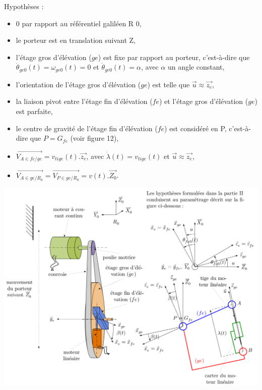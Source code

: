 Hypothèses :
\begin{itemize}
 \item 0 par rapport au référentiel galiléen R 0,
 \item le porteur est en translation suivant Z,
 \item l'étage gros d'élévation ($ge$) est fixe par rapport au porteur, c'est-à-dire que $\dot{\theta}_{ge0}(t)=\omega_{ge0}(t)=0$ et $\dot{\theta}_{ge0}(t)=\alpha$, avec $\alpha$ un angle constant,
 \item l'orientation de l'étage gros d'élévation ($ge$) est telle que $\overrightarrow{u}\approx \overrightarrow{z_e}$,
 \item la liaison pivot entre l'étage fin d'élévation ($fe$) et l'étage gros d'élévation ($ge$) est parfaite,
 \item  le centre de gravité de l'étage fin d'élévation ($fe$) est considéré en P, c'est-à-dire que $P=G_{fe}$ (voir figure 12),
 \item $\overrightarrow{V_{A\in fe/ge}}= v_{tige}(t).\overrightarrow{z_e}$, avec $\dot{\lambda}(t)= v_{tige}(t)$ et $\overrightarrow{u}\approx \overrightarrow{z_e}$,
 \item $\overrightarrow{V_{A\in ge/R_0}}=\overrightarrow{V_{P\in ge/R_0}}=v(t).\overrightarrow{Z_0}$.
\end{itemize}

\begin{center}
\includegraphics[width=0.9\linewidth]{img/fig12}
\end{center}

